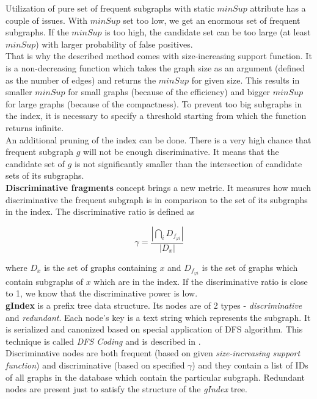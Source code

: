 Utilization of pure set of frequent subgraphs with static $ minSup $ attribute has a couple of issues. With $ minSup $ set too low, we get an enormous set of frequent subgraphs. If the $ minSup $ is too high, the candidate set can be too large (at least $ minSup $) with larger probability of false positives.\\

That is why the described method comes with size-increasing support function. It is a non-decreasing function which takes the graph size as an argument (defined as the number of edges) and returns the $ minSup $ for given size. This results in smaller $ minSup $ for small graphs (because of the efficiency) and bigger $ minSup $ for large graphs (because of the compactness). To prevent too big subgraphs in the index, it is necessary to specify a threshold starting from which the function returns infinite.\\


An additional pruning of the index can be done. There is a very high chance that frequent subgraph $ g $ will not be enough discriminative. It means that  the candidate set of $ g $ is not significantly smaller than the intersection of candidate sets of its subgraphs.\\

\textbf{Discriminative fragments} concept brings a new metric. It measures how much discriminative the frequent subgraph is in comparison to the set of its subgraphs in the index. The discriminative ratio is defined as

$$ \gamma = \frac{|\bigcap _{i} D_{f_{\varphi i}} |}{| D_{x} |} $$

\noindent where $D_{x}$ is the set of graphs containing $ x $ and $ D_{f_{\varphi i}} $ is the set of graphs which contain subgraphs of $ x $ which are in the index. If the discriminative ratio is close to 1, we know that the discriminative power is low.\\

\textbf{gIndex} is a prefix tree data structure. Its nodes are of 2 types - \textit{discriminative} and \textit{redundant}. Each node’s key is a text string which represents the subgraph. It is serialized and canonized based on special application of DFS algorithm. This technique is called \textit{DFS Coding} and is described in \cite{gspan}.\\

Discriminative nodes are both frequent (based on given \textit{size-increasing support function}) and discriminative (based on specified $ \gamma $) and they contain a list of IDs of all graphs in the database which contain the particular subgraph. Redundant nodes are present just to satisfy the structure of the \textit{gIndex} tree.\\

